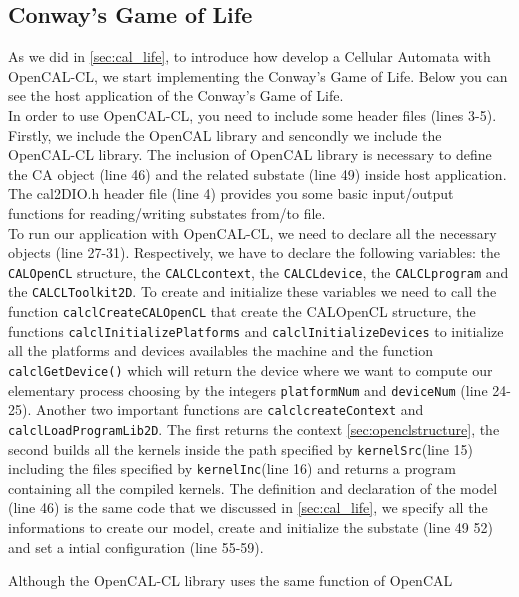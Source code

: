 \subsection{Conway's Game of Life}
 
 
As we did in \ref{sec:cal_life}, to introduce how develop a Cellular
Automata with OpenCAL-CL, we start implementing the Conway’s
Game of Life.  Below you can see the host application of the Conway’s
Game of Life.\\  In order to use OpenCAL-CL, you need to include some
header files (lines 3-5).  Firstly, we include the OpenCAL library and
sencondly we include the OpenCAL-CL library.  The inclusion of OpenCAL library
is necessary to define the CA object (line 46) and the
related substate (line 49) inside host application. The cal2DIO.h
header file (line 4) provides you some basic input/output functions
for reading/writing substates from/to file.\\  To run our application
with OpenCAL-CL, we need to declare all the necessary objects (line
27-31). Respectively, we have to declare the following variables: the
\verb'CALOpenCL' structure, the \verb'CALCLcontext', the
\verb'CALCLdevice', the \verb'CALCLprogram' and the
\verb'CALCLToolkit2D'.  To create and initialize these variables we
need to call the function \verb'calclCreateCALOpenCL' that create the
CALOpenCL structure, the functions \verb|calclInitializePlatforms| and
\verb|calclInitializeDevices| to initialize all the platforms and
devices availables the machine and the function \verb'calclGetDevice()' which
will return the device where we want to compute our elementary process
choosing by the integers \verb'platformNum' and \verb'deviceNum' (line
24-25).  Another two important functions are \verb'calclcreateContext'
and \verb'calclLoadProgramLib2D'.  The first returns the context
\ref{sec:openclstructure}, the second builds all the kernels inside the
path specified by \verb'kernelSrc'(line 15) including the files
specified by \verb'kernelInc'(line 16) and returns a program
containing all the compiled kernels.
The definition and declaration of the model (line 46) is the same code
that we discussed in \ref{sec:cal_life}, we specify all the informations
to create our model, create and initialize the substate (line 49 52) and 
set a intial configuration (line 55-59).

Although the OpenCAL-CL library uses the same function of OpenCAL
